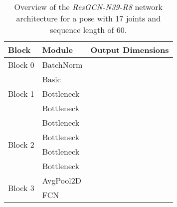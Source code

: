 \documentclass{article}
\begin{document}
\begin{table}
 \caption{Overview of the \textit{ResGCN-N39-R8} network architecture for a pose with 17 joints and sequence length of 60.}
 \label{tab:net}

\fontsize{9}{11}\selectfont
 \centering
 \begin{tabularx}{.71\linewidth}{l  l  c }
 \toprule
  Block & Module & Output Dimensions \\
 \midrule 
  Block 0 & BatchNorm &  \\
  \hline
  \multirow{3}{*}{Block 1}
   & Basic & \\
   & Bottleneck &  \\
   & Bottleneck &  \\
  \hline
  \multirow{4}{*}{Block 2}
   & Bottleneck &  \\
   & Bottleneck &  \\
   & Bottleneck &  \\
   & Bottleneck &  \\
   \hline
   \multirow{2}{*}{Block 3} & AvgPool2D &  \\
   & FCN &  \\
 \bottomrule
\end{tabularx}
\end{table}
\end{document}
